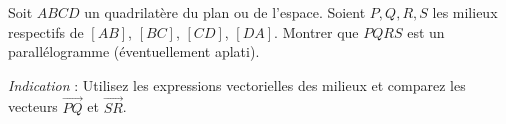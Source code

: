 Soit $ABCD$ un quadrilatère du plan ou de l'espace. Soient $P, Q, R, S$ les
milieux respectifs de $[AB]$, $[BC]$, $[CD]$, $[DA]$. Montrer que $PQRS$ est
un parallélogramme (éventuellement aplati).

\emph{Indication} : Utilisez les expressions vectorielles des milieux et
comparez les vecteurs $\overrightarrow{PQ}$ et $\overrightarrow{SR}$.

